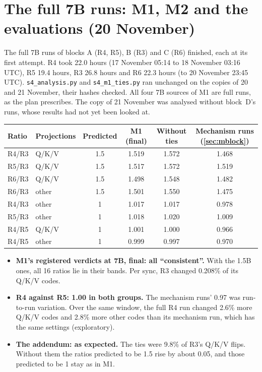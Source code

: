 \documentclass[11pt]{article}
\begin{document}
\section{The full 7B runs: M1, M2 and the evaluations (20 November)}\label{sec:full7b}
The full 7B runs of blocks A (R4, R5), B (R3) and C (R6) finished, each at its first attempt. R4 took 22.0 hours (17 November 05:14 to 18 November 03:16 UTC), R5 19.4 hours, R3 26.8 hours and R6 22.3 hours (to 20 November 23:45 UTC). \texttt{s4\_analysis.py} and \texttt{s4\_m1\_ties.py} ran unchanged on the copies of 20 and 21 November, their hashes checked. All four 7B sources of M1 are full runs, as the plan prescribes. The copy of 21 November was analysed without block~D's runs, whose results had not yet been looked at.
\begin{center}\small
\begin{tabular}{@{}l l c c c c@{}}
\toprule
Ratio & Projections & Predicted & M1 (final) & Without ties & Mechanism runs (\cref{sec:mblock})\\
\midrule
R4/R3 & Q/K/V & 1.5 & 1.519 & 1.572 & 1.468\\
R5/R3 & Q/K/V & 1.5 & 1.517 & 1.572 & 1.519\\
R6/R3 & Q/K/V & 1.5 & 1.498 & 1.548 & 1.482\\
R6/R3 & other & 1.5 & 1.501 & 1.550 & 1.475\\
R4/R3 & other & 1 & 1.017 & 1.017 & 0.978\\
R5/R3 & other & 1 & 1.018 & 1.020 & 1.009\\
R4/R5 & Q/K/V & 1 & 1.001 & 1.000 & 0.966\\
R4/R5 & other & 1 & 0.999 & 0.997 & 0.970\\
\bottomrule
\end{tabular}
\end{center}
\begin{itemize}
\item \textbf{M1's registered verdicts at 7B, final: all ``consistent''.} With the 1.5B ones, all 16 ratios lie in their bands. Per sync, R3 changed 0.208\% of its Q/K/V codes.
\item \textbf{R4 against R5: 1.00 in both groups.} The mechanism runs' 0.97 was run-to-run variation. Over the same window, the full R4 run changed 2.6\% more Q/K/V codes and 2.8\% more other codes than its mechanism run, which has the same settings (exploratory).
\item \textbf{The addendum: as expected.} The ties were 9.8\% of R3's Q/K/V flips. Without them the ratios predicted to be 1.5 rise by about 0.05, and those predicted to be 1 stay as in M1.
\end{itemize}
\end{document}

